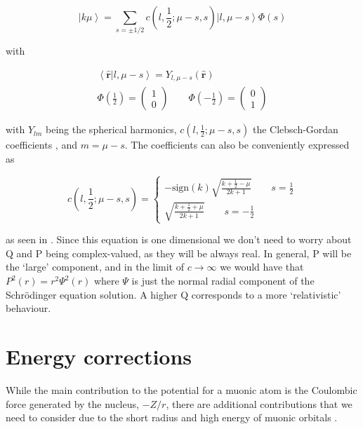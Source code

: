 \documentclass[]{report}
\begin{document}
\begin{equation}
\left|k\mu\right> = \sum_{s=\pm 1/2} c(l,\frac{1}{2};\mu-s, s)\left|l,\mu-s\right>\Phi(s)
\end{equation}

with

\begin{align}
\left<\mathbf{\hat{r}}|l,\mu-s\right> = Y_{l,\mu-s}(\mathbf{\hat{r}}) \\
\Phi\left(\frac{1}{2}\right) = \begin{pmatrix}
1 \\
0
\end{pmatrix}
\qquad
\Phi\left(-\frac{1}{2}\right) = \begin{pmatrix}
0 \\
1
\end{pmatrix} 
\end{align}

with $Y_{lm}$ being the spherical harmonics, $c(l,\frac{1}{2};\mu-s, s)$ the Clebsch-Gordan coefficients \cite{weinb2008}, and $m=\mu-s$. The coefficients can also be conveniently expressed as

\begin{equation}
c(l,\frac{1}{2};\mu-s, s) = \begin{cases}
-\mathrm{sign}(k)\sqrt{\frac{k+\frac{1}{2}-\mu}{2k+1}} \qquad s = \frac{1}{2} \\
\sqrt{\frac{k+\frac{1}{2}+\mu}{2k+1}} \qquad s = -\frac{1}{2}
\end{cases}
\end{equation}


as seen in \cite{gross1999, biedernharn1981}.\newline
Since this equation is one dimensional we don't need to worry about Q and P being complex-valued, as they will be always real. In general, P will be the `large' component, and in the limit of $c \rightarrow \infty$ we would have that $P^2(r) = r^2\Psi^2(r)$ where $\Psi$ is just the normal radial component of the Schr\"{o}dinger equation solution. A higher Q corresponds to a more `relativistic' behaviour.

\section{Energy corrections}

While the main contribution to the potential for a muonic atom is the Coulombic force generated by the nucleus, $-Z/r$, there are additional contributions that we need to consider due to the short radius and high energy of muonic orbitals \cite{borie1982}.
\end{document}
